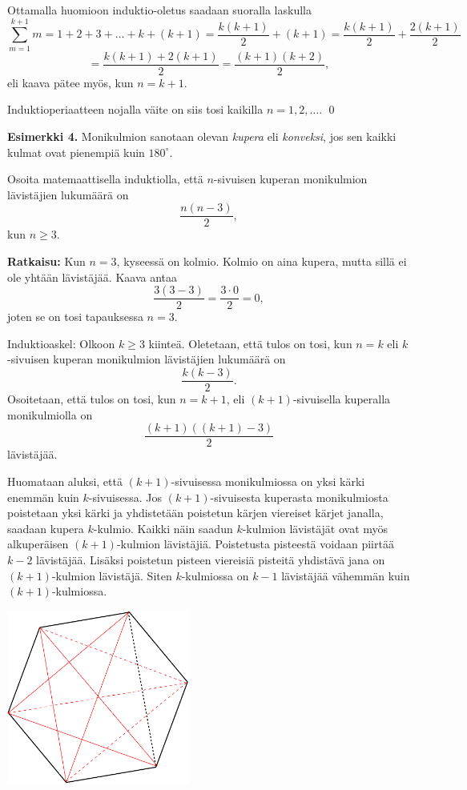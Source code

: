 Ottamalla huomioon induktio-oletus saadaan suoralla
laskulla
\[
\sum_{m=1}^{k+1} m = 1+2+3+ \ldots + k + (k + 1)
= \frac{k(k+1)}{2} + (k+1) = \frac{k(k+1)}{2} +
\frac{2(k+1)}{2}
\]
\[
=\frac{k(k+1) + 2(k+1)}{2} = \frac{(k+1)(k+2)}{2},
\]
eli kaava pätee myös, kun $n=k+1$.

Induktioperiaatteen nojalla väite on siis tosi kaikilla
$n=1,2,\ldots$.
\qed

{\bf Esimerkki 4.}
Monikulmion sanotaan olevan {\em kupera} eli {\em konveksi}, jos sen kaikki kulmat ovat pienempiä kuin $180^\circ$.

Osoita matemaattisella induktiolla, että $n$-sivuisen kuperan monikulmion lävistäjien
lukumäärä on
\[
\frac{n(n-3)}{2},
\]
kun $n\ge 3$.

{\bf Ratkaisu:}
Kun $n = 3$, kyseessä on kolmio. Kolmio on aina kupera, mutta sillä ei ole yhtään lävistäjää. Kaava antaa
\[
\frac{3(3-3)}{2}=\frac{3\cdot 0}{2} =0,
\]
joten se on tosi tapauksessa $n=3$.

Induktioaskel: Olkoon $k\ge 3$ kiinteä. Oletetaan, että tulos on tosi, kun $n=k$ eli $k$-sivuisen kuperan monikulmion lävistäjien lukumäärä on
\[
\frac{k(k-3)}{2}.
\]
Osoitetaan, että tulos on tosi, kun $n=k+1$, eli $(k+1)$-sivuisella kuperalla monikulmiolla on
\[
\frac{(k+1)((k+1)-3)}{2}
\]
lävistäjää.

Huomataan aluksi, että $(k+1)$-sivuisessa monikulmiossa on yksi kärki enemmän kuin $k$-sivuisessa. Jos $(k+1)$-sivuisesta kuperasta monikulmiosta poistetaan yksi kärki ja yhdistetään poistetun kärjen viereiset kärjet janalla, saadaan kupera $k$-kulmio. Kaikki näin saadun $k$-kulmion lävistäjät ovat myös alkuperäisen $(k+1)$-kulmion lävistäjiä.
Poistetusta pisteestä voidaan piirtää $k - 2$ lävistäjää. Lisäksi poistetun pisteen viereisiä pisteitä yhdistävä jana on $(k+1)$-kulmion lävistäjä. Siten $k$-kulmiossa on $k-1$ lävistäjää vähemmän kuin $(k+1)$-kulmiossa.

\begin{center}
\includegraphics[width=6cm]{kuvat/kulmiot}
\end{center}

